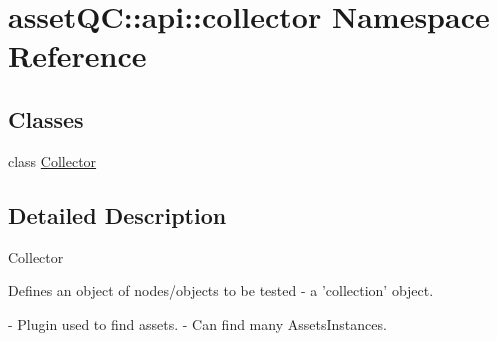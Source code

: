 \hypertarget{namespaceassetQC_1_1api_1_1collector}{\section{asset\-Q\-C\-:\-:api\-:\-:collector \-Namespace \-Reference}
\label{d1/d0a/namespaceassetQC_1_1api_1_1collector}
}
\subsection*{\-Classes}
\begin{DoxyCompactItemize}
\item 
class \hyperlink{classassetQC_1_1api_1_1collector_1_1Collector}{\-Collector}
\end{DoxyCompactItemize}


\subsection{\-Detailed \-Description}
\begin{DoxyVerb}
Collector

Defines an object of nodes/objects to be tested - a 'collection' object.

- Plugin used to find assets.
- Can find many AssetsInstances.
\end{DoxyVerb}
 